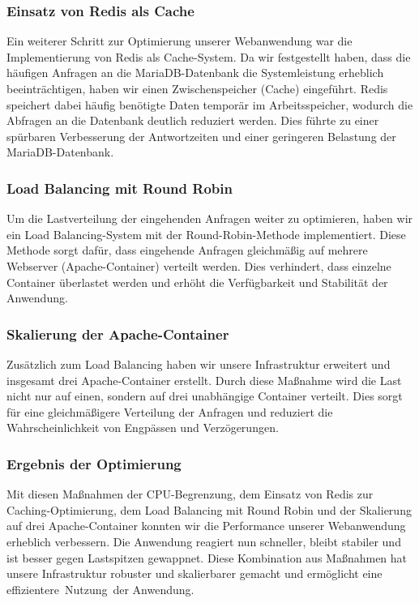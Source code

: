 \subsubsection{Einsatz von Redis als Cache}
Ein weiterer Schritt zur Optimierung unserer Webanwendung war die Implementierung von Redis als Cache-System. Da wir festgestellt haben, dass die häufigen Anfragen an die MariaDB-Datenbank die Systemleistung erheblich beeinträchtigen, haben wir einen Zwischenspeicher (Cache) eingeführt. Redis speichert dabei häufig benötigte Daten temporär im Arbeitsspeicher, wodurch die Abfragen an die Datenbank deutlich reduziert werden. Dies führte zu einer spürbaren Verbesserung der Antwortzeiten und einer geringeren Belastung der MariaDB-Datenbank.
\subsubsection{Load Balancing mit Round Robin}
Um die Lastverteilung der eingehenden Anfragen weiter zu optimieren, haben wir ein Load Balancing-System mit der Round-Robin-Methode implementiert. Diese Methode sorgt dafür, dass eingehende Anfragen gleichmäßig auf mehrere Webserver (Apache-Container) verteilt werden. Dies verhindert, dass einzelne Container überlastet werden und erhöht die Verfügbarkeit und Stabilität der Anwendung.
\subsubsection{Skalierung der Apache-Container}
Zusätzlich zum Load Balancing haben wir unsere Infrastruktur erweitert und insgesamt drei Apache-Container erstellt. Durch diese Maßnahme wird die Last nicht nur auf einen, sondern auf drei unabhängige Container verteilt. Dies sorgt für eine gleichmäßigere Verteilung der Anfragen und reduziert die Wahrscheinlichkeit von Engpässen und Verzögerungen.
\subsubsection{Ergebnis der Optimierung}
Mit diesen Maßnahmen der CPU-Begrenzung, dem Einsatz von Redis zur Caching-Optimierung, dem Load Balancing mit Round Robin und der Skalierung auf drei Apache-Container konnten wir die Performance unserer Webanwendung erheblich verbessern. Die Anwendung reagiert nun schneller, bleibt stabiler und ist besser gegen Lastspitzen gewappnet. Diese Kombination aus Maßnahmen hat unsere Infrastruktur robuster und skalierbarer gemacht und ermöglicht eine effizientere Nutzung der Anwendung.


